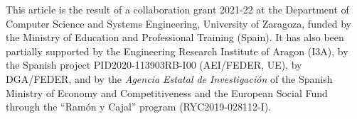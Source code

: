 \documentclass[
]{ceurart}
\begin{document}
\begin{acknowledgments}

This article is the result of a collaboration grant 2021-22 at the Department of Computer Science and Systems Engineering, University of Zaragoza, funded by the Ministry of Education and Professional Training (Spain). It has also been partially supported by the Engineering Research Institute of Aragon (I3A), by the Spanish project PID2020-113903RB-I00 (AEI/FEDER, UE), by DGA/FEDER, and by the {\em Agencia Estatal de Investigación} of the Spanish Ministry of Economy and Competitiveness and the European Social Fund through the ``Ramón y Cajal'' program (RYC2019-028112-I).


\end{acknowledgments}


\end{document}
